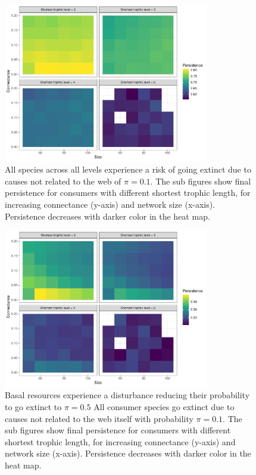 \documentclass[12pt]{article}
\begin{document}
\begin{spacing}{2.0}
    \begin{figure}[h!]
     \centering
     \includegraphics[width=0.8\textwidth]{figures/heatmap_STL_allCS_BP0.pdf}
     \caption{All species across all levels experience a risk of going extinct due to causes not related to the web of $\pi = 0.1$. The sub figures show final persistence for consumers with different shortest trophic length, for increasing connectance (y-axis) and network size (x-axis). Persistence decreases with darker color in the heat map.}
     \label{fig:heatmap_stl_BP0}
    \end{figure}


    \begin{figure}[h!]
     \centering
     \includegraphics[width=0.8\textwidth]{figures/heatmap_STL_allCS_BP1.pdf}
     \caption{Basal resources experience a disturbance reducing their probability to go extinct to $\pi = 0.5$ All consumer species go extinct due to causes not related to the web itself with probability $\pi = 0.1$. The sub figures show final persistence for consumers with different shortest trophic length, for increasing connectance (y-axis) and network size (x-axis). Persistence decreases with darker color in the heat map.}
     \label{fig:heatmap_stl_BP1}
    \end{figure}


\end{spacing}
\end{document}

